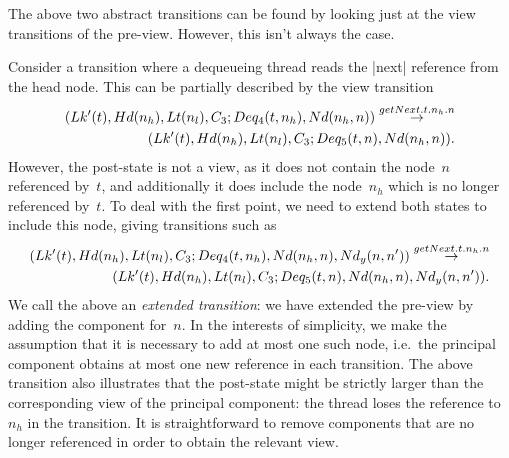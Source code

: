 The above two abstract transitions can be found by looking just at the view
transitions of the pre-view.  However, this isn't always the case.

Consider a transition where a dequeueing thread reads the |next| reference
from the head node.  This can be partially described by the view transition
\[
\begin{align}
(Lk'(t), Hd(n_h), Lt(n_l), C_3; Deq_4(t, n_h), Nd(n_h, n))
  \stackrel{getNext.t.n_h.n}\rightarrow \\
\qquad (Lk'(t), Hd(n_h), Lt(n_l), C_3; Deq_5(t, n), Nd(n_h, n)).
\end{align}
\]
However, the post-state is not a view, as it does not contain the node~$n$
referenced by~$t$, and additionally it does include the node~$n_h$ which is no
longer referenced by~$t$.  To deal with the first point, we need to extend
both states to include this node, giving transitions such as
\begin{equation}
\begin{align}
(Lk'(t), Hd(n_h), Lt(n_l), C_3; 
  Deq_4(t, n_h), Nd(n_h, n), Nd_y(n, n'))  \stackrel{getNext.t.n_h.n}\rightarrow \\
\qquad (Lk'(t), Hd(n_h), Lt(n_l), C_3; 
  Deq_5(t, n), Nd(n_h, n), Nd_y(n, n')).
\label{trans:getNext}
\end{align}
\end{equation}
%
%
%
We call the above an \emph{extended transition}: we have extended the pre-view
by adding the component for~$n$.  In the interests of simplicity, we make the
assumption that it is necessary to add at most one such node, i.e.~the
principal component obtains at most one new reference in each transition.
The above transition also illustrates that the post-state might be strictly
larger than the corresponding view of the principal component: the thread
loses the reference to~$n_h$ in the transition.  It is straightforward to remove
components that are no longer referenced in order to obtain the relevant view.

